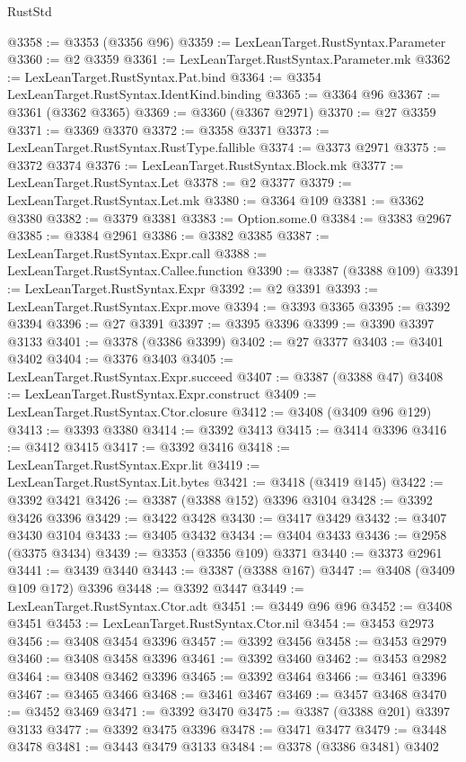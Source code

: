 \begin{lexlean}{RustStd}
\begin{coremodule}
@3358 := @3353 (@3356 @96)
@3359 := LexLeanTarget.RustSyntax.Parameter
@3360 := @2 @3359
@3361 := LexLeanTarget.RustSyntax.Parameter.mk
@3362 := LexLeanTarget.RustSyntax.Pat.bind
@3364 := @3354 LexLeanTarget.RustSyntax.IdentKind.binding
@3365 := @3364 @96
@3367 := @3361 (@3362 @3365)
@3369 := @3360 (@3367 @2971)
@3370 := @27 @3359
@3371 := @3369 @3370
@3372 := @3358 @3371
@3373 := LexLeanTarget.RustSyntax.RustType.fallible
@3374 := @3373 @2971
@3375 := @3372 @3374
@3376 := LexLeanTarget.RustSyntax.Block.mk
@3377 := LexLeanTarget.RustSyntax.Let
@3378 := @2 @3377
@3379 := LexLeanTarget.RustSyntax.Let.mk
@3380 := @3364 @109
@3381 := @3362 @3380
@3382 := @3379 @3381
@3383 := Option.some.{0}
@3384 := @3383 @2967
@3385 := @3384 @2961
@3386 := @3382 @3385
@3387 := LexLeanTarget.RustSyntax.Expr.call
@3388 := LexLeanTarget.RustSyntax.Callee.function
@3390 := @3387 (@3388 @109)
@3391 := LexLeanTarget.RustSyntax.Expr
@3392 := @2 @3391
@3393 := LexLeanTarget.RustSyntax.Expr.move
@3394 := @3393 @3365
@3395 := @3392 @3394
@3396 := @27 @3391
@3397 := @3395 @3396
@3399 := @3390 @3397 @3133
@3401 := @3378 (@3386 @3399)
@3402 := @27 @3377
@3403 := @3401 @3402
@3404 := @3376 @3403
@3405 := LexLeanTarget.RustSyntax.Expr.succeed
@3407 := @3387 (@3388 @47)
@3408 := LexLeanTarget.RustSyntax.Expr.construct
@3409 := LexLeanTarget.RustSyntax.Ctor.closure
@3412 := @3408 (@3409 @96 @129)
@3413 := @3393 @3380
@3414 := @3392 @3413
@3415 := @3414 @3396
@3416 := @3412 @3415
@3417 := @3392 @3416
@3418 := LexLeanTarget.RustSyntax.Expr.lit
@3419 := LexLeanTarget.RustSyntax.Lit.bytes
@3421 := @3418 (@3419 @145)
@3422 := @3392 @3421
@3426 := @3387 (@3388 @152) @3396 @3104
@3428 := @3392 @3426 @3396
@3429 := @3422 @3428
@3430 := @3417 @3429
@3432 := @3407 @3430 @3104
@3433 := @3405 @3432
@3434 := @3404 @3433
@3436 := @2958 (@3375 @3434)
@3439 := @3353 (@3356 @109) @3371
@3440 := @3373 @2961
@3441 := @3439 @3440
@3443 := @3387 (@3388 @167)
@3447 := @3408 (@3409 @109 @172) @3396
@3448 := @3392 @3447
@3449 := LexLeanTarget.RustSyntax.Ctor.adt
@3451 := @3449 @96 @96
@3452 := @3408 @3451
@3453 := LexLeanTarget.RustSyntax.Ctor.nil
@3454 := @3453 @2973
@3456 := @3408 @3454 @3396
@3457 := @3392 @3456
@3458 := @3453 @2979
@3460 := @3408 @3458 @3396
@3461 := @3392 @3460
@3462 := @3453 @2982
@3464 := @3408 @3462 @3396
@3465 := @3392 @3464
@3466 := @3461 @3396
@3467 := @3465 @3466
@3468 := @3461 @3467
@3469 := @3457 @3468
@3470 := @3452 @3469
@3471 := @3392 @3470
@3475 := @3387 (@3388 @201) @3397 @3133
@3477 := @3392 @3475 @3396
@3478 := @3471 @3477
@3479 := @3448 @3478
@3481 := @3443 @3479 @3133
@3484 := @3378 (@3386 @3481) @3402

\end{coremodule}
\end{lexlean}
